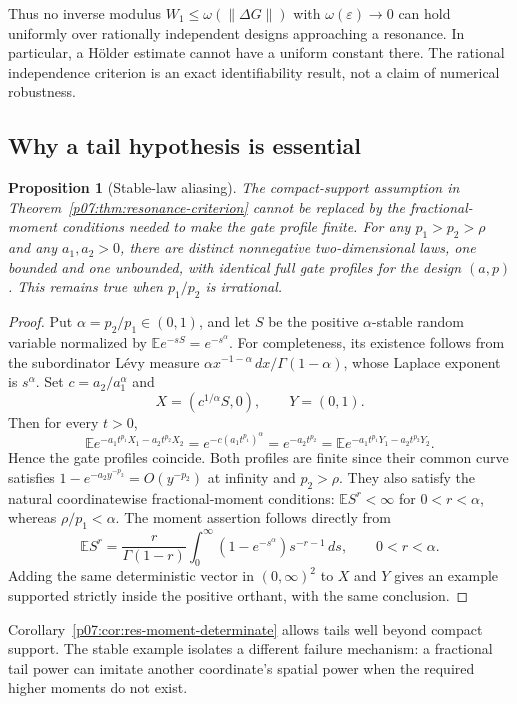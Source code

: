 \documentclass[11pt,letterpaper]{article}
\newtheorem{proposition}[theorem]{Proposition}
\theoremstyle{definition}
\theoremstyle{remark}
\newcommand{\1}{\mathbf 1}
\begin{document}
Thus no inverse modulus $W_1\leq\omega(\|\Delta G\|)$ with
$\omega(\varepsilon)\to0$ can hold uniformly over rationally
independent designs approaching a resonance.  In particular, a
H\"older estimate cannot have a uniform constant there.
The rational independence criterion is an exact identifiability
result, not a claim of numerical robustness.

\subsection{Why a tail hypothesis is essential}

\begin{proposition}[Stable-law aliasing]\label{p07:prop:res-stable-alias}
The compact-support assumption in
Theorem~\ref{p07:thm:resonance-criterion} cannot be replaced by the
fractional-moment conditions needed to make the gate profile finite.
For any $p_1>p_2>\rho$ and any $a_1,a_2>0$, there are distinct
nonnegative two-dimensional laws, one bounded and one unbounded,
with identical full gate profiles for the design $(a,p)$.
This remains true when $p_1/p_2$ is irrational.
\end{proposition}

\begin{proof}
Put $\alpha=p_2/p_1\in(0,1)$, and let $S$ be the positive
$\alpha$-stable random variable normalized by
$\mathbb E e^{-sS}=e^{-s^\alpha}$.
For completeness, its existence follows from the subordinator
L\'evy measure
$\alpha x^{-1-\alpha}\,dx/\Gamma(1-\alpha)$, whose Laplace
exponent is $s^\alpha$.
Set $c=a_2/a_1^\alpha$ and
\[
 X=(c^{1/\alpha}S,0),\qquad Y=(0,1).
\]
Then for every $t>0$,
\[
 \mathbb E e^{-a_1t^{p_1}X_1-a_2t^{p_2}X_2}
 =e^{-c(a_1t^{p_1})^\alpha}
 =e^{-a_2t^{p_2}}
 =\mathbb E e^{-a_1t^{p_1}Y_1-a_2t^{p_2}Y_2}.
\]
Hence the gate profiles coincide.
Both profiles are finite since their common curve satisfies
$1-e^{-a_2y^{-p_2}}=O(y^{-p_2})$ at infinity and $p_2>\rho$.
They also satisfy the natural coordinatewise fractional-moment
conditions: $\mathbb E S^r<\infty$ for $0<r<\alpha$,
whereas $\rho/p_1<\alpha$.
The moment assertion follows directly from
\[
 \mathbb E S^r
 =\frac{r}{\Gamma(1-r)}\int_0^\infty
       (1-e^{-s^\alpha})s^{-r-1}\,ds,
 \qquad 0<r<\alpha.
\]
Adding the same deterministic vector in $(0,\infty)^2$ to $X$
and $Y$ gives an example supported strictly inside the positive
orthant, with the same conclusion.
\end{proof}

Corollary~\ref{p07:cor:res-moment-determinate} allows tails well beyond
compact support.  The stable example isolates a different failure
mechanism: a fractional tail power can imitate another coordinate's
spatial power when the required higher moments do not exist.
\end{document}
